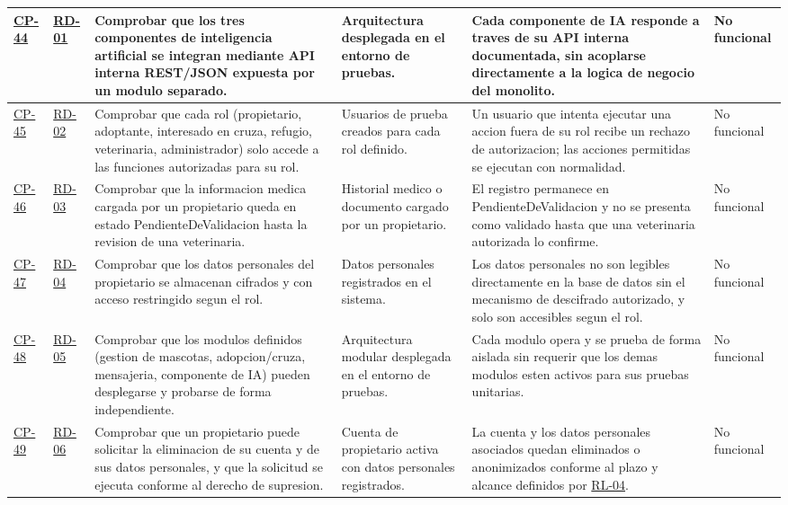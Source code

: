 \documentclass[journal,onecolumn]{IEEEtran}
\begin{document}
\begin{landscape}
\begin{longtable}{@{}p{1.3cm} p{1.3cm} p{4.6cm} p{3.6cm} p{5.2cm} p{1.6cm}@{}}
			\hyperref[cp:44]{CP-44}\label{cp:44} & \hyperref[tab:RD-01]{RD-01} & Comprobar que los tres componentes de inteligencia artificial se integran mediante API interna REST/JSON expuesta por un modulo separado. & Arquitectura desplegada en el entorno de pruebas. & Cada componente de IA responde a traves de su API interna documentada, sin acoplarse directamente a la logica de negocio del monolito. & No funcional \\ \midrule
			\hyperref[cp:45]{CP-45}\label{cp:45} & \hyperref[tab:RD-02]{RD-02} & Comprobar que cada rol (propietario, adoptante, interesado en cruza, refugio, veterinaria, administrador) solo accede a las funciones autorizadas para su rol. & Usuarios de prueba creados para cada rol definido. & Un usuario que intenta ejecutar una accion fuera de su rol recibe un rechazo de autorizacion; las acciones permitidas se ejecutan con normalidad. & No funcional \\ \midrule
			\hyperref[cp:46]{CP-46}\label{cp:46} & \hyperref[tab:RD-03]{RD-03} & Comprobar que la informacion medica cargada por un propietario queda en estado PendienteDeValidacion hasta la revision de una veterinaria. & Historial medico o documento cargado por un propietario. & El registro permanece en PendienteDeValidacion y no se presenta como validado hasta que una veterinaria autorizada lo confirme. & No funcional \\ \midrule
			\hyperref[cp:47]{CP-47}\label{cp:47} & \hyperref[tab:RD-04]{RD-04} & Comprobar que los datos personales del propietario se almacenan cifrados y con acceso restringido segun el rol. & Datos personales registrados en el sistema. & Los datos personales no son legibles directamente en la base de datos sin el mecanismo de descifrado autorizado, y solo son accesibles segun el rol. & No funcional \\ \midrule
			\hyperref[cp:48]{CP-48}\label{cp:48} & \hyperref[tab:RD-05]{RD-05} & Comprobar que los modulos definidos (gestion de mascotas, adopcion/cruza, mensajeria, componente de IA) pueden desplegarse y probarse de forma independiente. & Arquitectura modular desplegada en el entorno de pruebas. & Cada modulo opera y se prueba de forma aislada sin requerir que los demas modulos esten activos para sus pruebas unitarias. & No funcional \\ \midrule
			\hyperref[cp:49]{CP-49}\label{cp:49} & \hyperref[tab:RD-06]{RD-06} & Comprobar que un propietario puede solicitar la eliminacion de su cuenta y de sus datos personales, y que la solicitud se ejecuta conforme al derecho de supresion. & Cuenta de propietario activa con datos personales registrados. & La cuenta y los datos personales asociados quedan eliminados o anonimizados conforme al plazo y alcance definidos por \hyperref[rl:04]{RL-04}. & No funcional \\ \midrule

\end{longtable}
\end{landscape}
\end{document}

